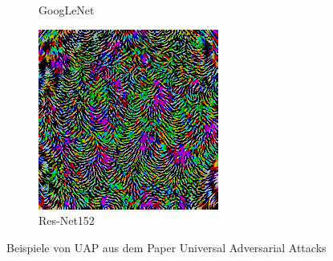\begin{figure}[ht!]
\begin{subfigure}{0.16\linewidth}
        \caption{GoogLeNet}
    \end{subfigure}\hfill%
    \begin{subfigure}{0.16\linewidth}
        \centering
        \includegraphics[height=1\linewidth]{01-images/05-resultate/uap_paper/uap-paper-resnet152.png}
        \caption{Res-Net152}
    \end{subfigure}
    \caption{Beispiele von UAP aus dem Paper Universal Adversarial Attacks \cite{moosavi-dezfooli_universal_2017}}
    \label{fig:referenzuap}
\end{figure}